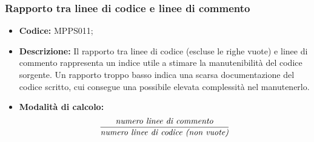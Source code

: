 \documentclass[../NormediProgetto.tex]{subfiles}
\begin{document}
\subsubsection{Rapporto tra linee di codice e linee di commento}

\begin{itemize}
	
	\item \textbf{Codice:} MPPS011;
	
	\item \textbf{Descrizione:} Il rapporto tra linee di codice (escluse le righe vuote) e linee di commento rappresenta un indice utile a stimare la manutenibilità del codice sorgente. Un rapporto troppo basso indica una scarsa documentazione del codice scritto, cui consegue una possibile elevata complessità nel manutenerlo.
	
	\item \textbf{Modalità di calcolo:}
	\[\frac{\textrm{\textit{numero linee di commento}}}{\textrm{\textit{numero linee di codice (non vuote)}}} \]
\end{itemize}

\end{document}
